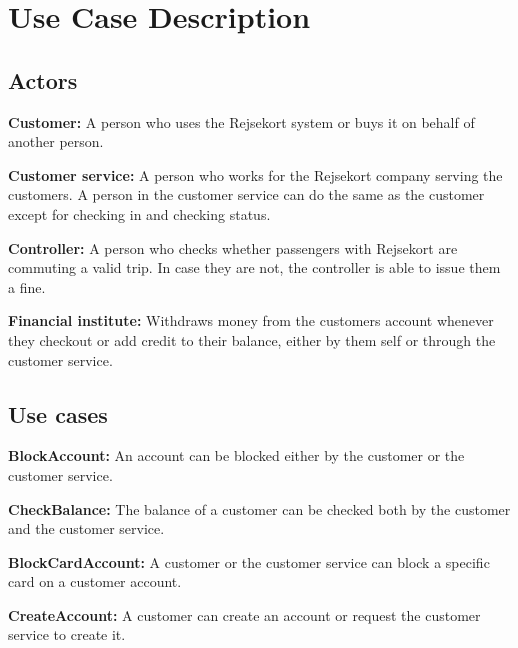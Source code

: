 \renewcommand{\headrulewidth}{0.1pt}
\renewcommand{\footrulewidth}{0.1pt}

\section*{Use Case Description}

\subsection*{Actors}

\textbf{Customer:}
A person who uses the Rejsekort system or buys it on behalf of another person.

\textbf{Customer service:}
A person who works for the Rejsekort company serving the customers. A person in the customer service can do the same as the customer except for checking in and checking status.

\textbf{Controller:}
A person who checks whether passengers with Rejsekort are commuting a valid trip. In case they are not, the controller is able to issue them a fine.

\textbf{Financial institute:}
Withdraws money from the customers account whenever they checkout or add credit to their balance, either by them self or through the customer service.

\subsection*{Use cases}
\textbf{BlockAccount:}
An account can be blocked either by the customer or the customer service.

\textbf{CheckBalance:}
The balance of a customer can be checked both by the customer and the customer service.

\textbf{BlockCardAccount:}
A customer or the customer service can block a specific card on a customer account.

\textbf{CreateAccount:}
A customer can create an account or request the customer service to create it.

